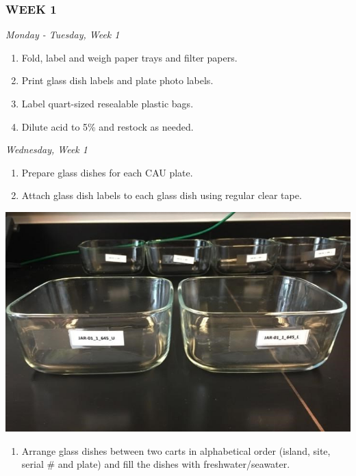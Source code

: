 \documentclass[]{book}
\providecommand{\tightlist}{%
  \setlength{\itemsep}{0pt}\setlength{\parskip}{0pt}}
\begin{document}
\hypertarget{week-1}{%
\subsubsection{WEEK 1}\label{week-1}}

\emph{Monday - Tuesday, Week 1}

\begin{enumerate}
\def\labelenumi{\arabic{enumi}.}
\tightlist
\item
  Fold, label and weigh paper trays and filter papers.
\item
  Print glass dish labels and plate photo labels.
\item
  Label quart-sized resealable plastic bags.
\item
  Dilute acid to 5\% and restock as needed.
\end{enumerate}

\emph{Wednesday, Week 1}

\begin{enumerate}
\def\labelenumi{\arabic{enumi}.}
\tightlist
\item
  Prepare glass dishes for each CAU plate.
\item
  Attach glass dish labels to each glass dish using regular clear tape.
\end{enumerate}

\includegraphics{images/DailyTasks2.jpg}

\begin{enumerate}
\def\labelenumi{\arabic{enumi}.}
\setcounter{enumi}{2}
\tightlist
\item
  Arrange glass dishes between two carts in alphabetical order (island, site, serial \# and plate) and fill the dishes with freshwater/seawater.
\end{enumerate}
\end{document}
